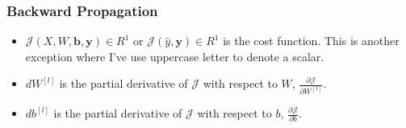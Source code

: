 \hypertarget{backward-propagation}{%
\subsubsection{Backward Propagation}\label{backward-propagation}}

\begin{itemize}
\tightlist
\item
  \(\mathcal{J}(X, W, \mathbf{b}, \mathbf{y})\in R^1\) or
  \(\mathcal{J}(\hat{y}, \mathbf{y}) \in R^1\) is the cost function.
  This is another exception where I've use uppercase letter to denote a
  scalar.
\item
  \(d{W^{[l]}}\) is the partial derivative of \(\mathcal{J}\) with
  respect to \(W\), \(\frac{\partial{\mathcal{J}}}{\partial W^{[1]}}\).
\item
  \(d{b^{[l]}}\) is the partial derivative of \(\mathcal{J}\) with
  respect to \(b\), \(\frac{\partial{\mathcal{J}}}{\partial b}\).
\end{itemize}
